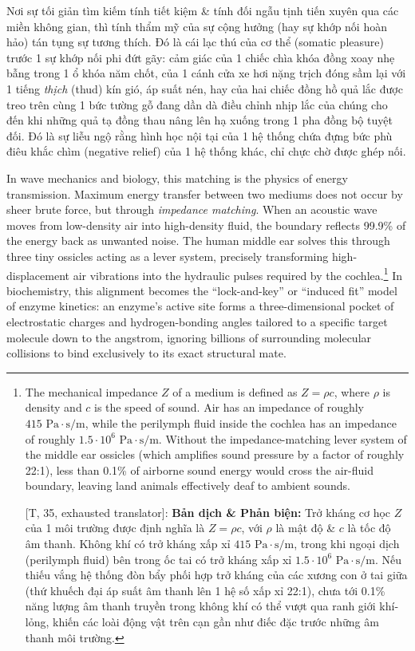 \documentclass[11pt]{article}
\begin{document}
Nơi sự tối giản tìm kiếm tính tiết kiệm \& tính đối ngẫu tịnh tiến xuyên qua các miền không gian, thì tính thẩm mỹ của sự cộng hưởng (hay sự khớp nối hoàn hảo) tán tụng sự tương thích. Đó là cái lạc thú của cơ thể (somatic pleasure) trước 1 sự khớp nối phi đứt gãy: cảm giác của 1 chiếc chìa khóa đồng xoay nhẹ bẫng trong 1 ổ khóa năm chốt, của 1 cánh cửa xe hơi nặng trịch đóng sầm lại với 1 tiếng \textit{thịch} (thud) kín gió, áp suất nén, hay của hai chiếc đồng hồ quả lắc được treo trên cùng 1 bức tường gỗ đang dần dà điều chỉnh nhịp lắc của chúng cho đến khi những quả tạ đồng thau nâng lên hạ xuống trong 1 pha đồng bộ tuyệt đối. Đó là sự liễu ngộ rằng hình học nội tại của 1 hệ thống chứa đựng bức phù điêu khắc chìm (negative relief) của 1 hệ thống khác, chỉ chực chờ được ghép nối.

In wave mechanics and biology, this matching is the physics of energy transmission. Maximum energy transfer between two mediums does not occur by sheer brute force, but through \emph{impedance matching}. When an acoustic wave moves from low-density air into high-density fluid, the boundary reflects 99.9\% of the energy back as unwanted noise. The human middle ear solves this through three tiny ossicles acting as a lever system, precisely transforming high-displacement air vibrations into the hydraulic pulses required by the cochlea.\footnote{The mechanical impedance $Z$ of a medium is defined as $Z = \rho c$, where $\rho$ is density and $c$ is the speed of sound. Air has an impedance of roughly $415 \text{ Pa} \cdot \text{s/m}$, while the perilymph fluid inside the cochlea has an impedance of roughly $1.5 \cdot 10^6 \text{ Pa} \cdot \text{s/m}$. Without the impedance-matching lever system of the middle ear ossicles (which amplifies sound pressure by a factor of roughly 22:1), less than 0.1\% of airborne sound energy would cross the air-fluid boundary, leaving land animals effectively deaf to ambient sounds.
	
	\textsf{[T, 35, exhausted translator]:} \textbf{Bản dịch \& Phản biện:} Trở kháng cơ học $Z$ của 1 môi trường được định nghĩa là $Z = \rho c$, với $\rho$ là mật độ \& $c$ là tốc độ âm thanh. Không khí có trở kháng xấp xỉ $415 \text{ Pa} \cdot \text{s/m}$, trong khi ngoại dịch (perilymph fluid) bên trong ốc tai có trở kháng xấp xỉ $1.5 \cdot 10^6 \text{ Pa} \cdot \text{s/m}$. Nếu thiếu vắng hệ thống đòn bẩy phối hợp trở kháng của các xương con ở tai giữa (thứ khuếch đại áp suất âm thanh lên 1 hệ số xấp xỉ 22:1), chưa tới 0.1\% năng lượng âm thanh truyền trong không khí có thể vượt qua ranh giới khí-lỏng, khiến các loài động vật trên cạn gần như điếc đặc trước những âm thanh môi trường.} In biochemistry, this alignment becomes the ``lock-and-key'' or ``induced fit'' model of enzyme kinetics: an enzyme's active site forms a three-dimensional pocket of electrostatic charges and hydrogen-bonding angles tailored to a specific target molecule down to the angstrom, ignoring billions of surrounding molecular collisions to bind exclusively to its exact structural mate.
\end{document}
